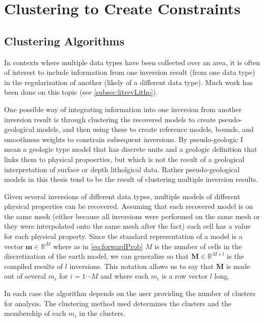 \section{Clustering to Create Constraints}
\label{sec:cluster}

\subsection{Clustering Algorithms}
\label{subsec:clusterAlgo}

In contexts where multiple data types have been collected over an area, it is often of interest to include information from one inversion result (from one data type) in the regularization of another (likely of a different data type). Much work has been done on this topic (see \autoref{subsec:litrevLitho}). 

One possible way of integrating information into one inversion from another inversion result is through clustering the recovered models to create pseudo-geological models, and then using these to create reference models, bounds, and smoothness weights to constrain subsequent inversions. By pseudo-geologic I mean a geologic type model that has discrete units and a geologic definition that links them to physical propoerties, but which is not the result of a geological interpretation of surface or depth litholgical data. Rather pseudo-geological models in this thesis tend to be the result of clustering multiple inversion results.

Given several inversions of different data types, multiple models of different physical properties can be recovered. Assuming that each recovered model is on the same mesh (either because all inversions were performed on the same mesh or they were interpolated onto the same mesh after the fact) each cell has a value for each physical property. Since the standard representation of a model is a vector $\mathbf m \in \mathbb R^M$ where as in \autoref{eq:forwardProb} $M$ is the number of cells in the discretization of the earth model, we can generalize so that $\mathbf M \in \mathbb R^{M\times l}$ is the compiled results of $l$ inversions. This notation allows us to say that $\mathbf M$ is made out of several $m_i$ for $i = 1 \cdots M$ and where each $m_i$ is a row vector $l$ long.

In each case the algorithm depends on the user providing the number of clusters for analysis. The clustering method used determines the clusters and the membership of each $m_i$ in the clusters.

